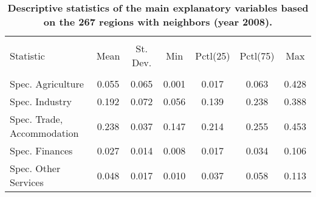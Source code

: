 \documentclass[11pt]{article}
\begin{document}
\begin{table}[!htbp] \centering 
  \caption{\textbf{Descriptive statistics of the main explanatory variables based on the 267 regions with neighbors (year 2008).}} 
  \label{descriptive_vars_filtered} 
\begin{tabular}{@{\extracolsep{5pt}}lcccccc} 
\\[-1.8ex]\hline 
\hline \\[-1.8ex] 
Statistic  & \multicolumn{1}{c}{Mean} & \multicolumn{1}{c}{St. Dev.} & \multicolumn{1}{c}{Min} & \multicolumn{1}{c}{Pctl(25)} & \multicolumn{1}{c}{Pctl(75)} & \multicolumn{1}{c}{Max} \\ 
\hline \\[-1.8ex] 
Spec. Agriculture & 0.055 & 0.065 & 0.001 & 0.017 & 0.063 & 0.428 \\ 
Spec. Industry  & 0.192 & 0.072 & 0.056 & 0.139 & 0.238 & 0.388 \\ 
Spec. Trade, Accommodation  & 0.238 & 0.037 & 0.147 & 0.214 & 0.255 & 0.453 \\ 
Spec. Finances  & 0.027 & 0.014 & 0.008 & 0.017 & 0.034 & 0.106 \\ 
Spec. Other Services & 0.048 & 0.017 & 0.010 & 0.037 & 0.058 & 0.113 \\ 

\end{tabular}
\end{table}
\end{document}
